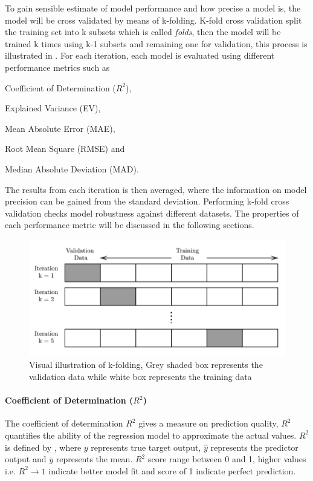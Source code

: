To gain sensible estimate of model performance and how precise a model is, the model will be cross validated by means of k-folding. K-fold cross validation split the training set into k subsets which is called \emph{folds}, then the model will be trained k times using k-1 subsets and remaining one for validation, this process is illustrated in . For each iteration, each model is evaluated using different performance metrics such as \begin{enumerate*}[label={(\arabic*)}]
    \item  Coefficient of Determination ($R^2$), 
    \item Explained Variance (EV), 
    \item Mean Absolute Error (MAE),
    \item Root Mean Square (RMSE) and
    \item Median Absolute Deviation (MAD). 
\end{enumerate*} The results from each iteration is then averaged, where the information on model precision can be gained from the standard deviation. Performing k-fold cross validation checks model robustness against different datasets. The properties of each performance metric will be discussed in the following sections.

\begin{figure}
    \centering
    \includegraphics[width=.85\textwidth]{02_figures/kfold.png}
    \caption{Visual illustration of k-folding, Grey shaded box represents the validation data while white box represents the training data}
    \label{fig:kfold}
\end{figure}

\paragraph{Coefficient of Determination ({$R^2$})}\label{rsquared}

The coefficient of determination $R^2$ gives a measure on prediction quality, $R^2$ quantifies the ability of the regression model to approximate the actual values. $R^2 $ is defined by , where $y$ represents true target output, $\hat{y}$ represents the predictor output and $\overline{y}$ represents the mean. $R^2$ score range between 0 and 1, higher values i.e. $R^2 \rightarrow 1$ indicate better model fit and score of 1 indicate perfect prediction.\\

